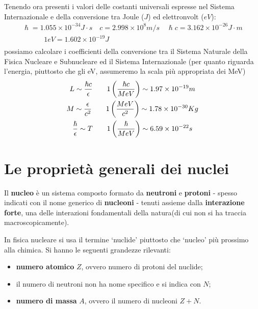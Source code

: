 Tenendo ora presenti i valori delle costanti universali espresse nel Sistema Internazionale e della conversione tra Joule
($J$) ed elettronvolt ($eV$):
\begin{gather*}
    \hslash = 1.055 \times 10^{-34} J \cdot s \quad c = 2.998 \times 10^8 m/s \quad \hslash c = 3.162 \times 10^{-26} J \cdot m\\
    \qquad \quad 1 eV = 1.602 \times 10^{-19} J\\
\end{gather*}
possiamo calcolare i coefficienti della conversione tra il Sistema Naturale della Fisica Nucleare e Subnucleare ed il Sistema Internazionale (per quanto riguarda l'energia, piuttosto che gli eV, assumeremo la scala più appropriata dei MeV) \begin{gather*}
    L \sim \frac{\hslash c}{\epsilon} \qquad 1 \left(\frac{\hslash c}{MeV}\right) \sim 1.97      \times 10^{-19} m\\
    M \sim \frac{\epsilon}{c^2} \qquad 1 \left(\frac{MeV}{c^2}\right) \sim 1.78 \times 10^{-30} Kg\\
    \frac{\hslash}{\epsilon} \sim T \qquad 1 \left ( \frac{\hslash}{MeV} \right) \sim 6.59 \times 10^{-22} s\\
\end{gather*}

\section{Le proprietà generali dei nuclei}
\label{sec:proprieta-generali-dei-nuclei}

Il \textbf{nucleo} è un sistema composto formato da \textbf{neutroni} e \textbf{protoni} - spesso indicati con il nome
generico di \textbf{nucleoni} - tenuti assieme dalla \textbf{interazione forte}, una delle interazioni fondamentali
della natura(di cui non si ha traccia macroscopicamente).

In fisica nucleare si usa il termine `nuclide' piuttosto che `nucleo' più prossimo alla chimica.
Si hanno le seguenti grandezze rilevanti:
\begin{itemize}
    \item \textbf{numero atomico} $Z$, ovvero numero di protoni del nuclide;
    \item il numero di neutroni non ha nome specifico e si indica con $N$;
    \item \textbf{numero di massa} $A$, ovvero il numero di nucleoni $Z+N$.
\end{itemize}

